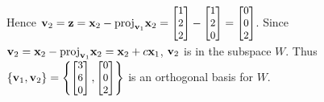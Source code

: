 \documentclass[xcolor=dvipsnames,aspectratio=169,t]{beamer}
\begin{document}
\begin{frame}
\begin{columns}[T]
  \ii Hence $\mathbf{v}_2 = \mathbf{z} = \mathbf{x}_2 - \mbox{proj}_{\mathbf{v}_1} \mathbf{x}_2 =
  {\small \begin{bmatrix} 1 \\ 2 \\ 2 \end{bmatrix}
        - \begin{bmatrix} 1 \\ 2 \\ 0 \end{bmatrix} =
           \begin{bmatrix} 0 \\ 0 \\ 2 \end{bmatrix}}$.
  \pause
  \ii Since $\mathbf{v}_2 = \mathbf{x}_2 - \mbox{proj}_{\mathbf{v}_1} \mathbf{x}_2 = \mathbf{x}_2 + c \mathbf{x}_1$, $\mathbf{v}_2$ is in the subspace $W$.
  \pause
  \ii Thus $\left\{ \mathbf{v}_1 , \mathbf{v}_2 \right\} = \left\{ 
    {\small \begin{bmatrix} 3 \\ 6 \\ 0 \end{bmatrix} , 
            \begin{bmatrix} 0 \\ 0 \\ 2 \end{bmatrix} } \right\}$ 
    is an \alert{orthogonal basis} for $W$.
  \ei
  \end{columns}
\end{frame}
\end{document}
